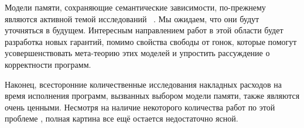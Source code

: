 Модели памяти, сохраняющие семантические зависимости, 
по-прежнему являются активной темой исследований~%
\cite{Kang-al:POPL17, Lee-al:PLDI20, Cho-al:PLDI21,
Chakraborty-Vafeiadis:POPL19, Paviotti-al:ESOP20, 
Jagadeesan-al:OOPSLA2020}.
Мы ожидаем, что они будут уточняться в будущем. 
Интересным направлением работ в этой области 
будет разработка новых гарантий, 
помимо свойства свободы от гонок, 
которые помогут усовершенствовать мета-теорию 
этих моделей и упростить рассуждение о корректности программ. 

Наконец, всесторонние количественные исследования 
накладных расходов на время исполнения программ, 
вызванных выбором модели памяти, также являются очень ценными. 
Несмотря на наличие некоторого количества работ по этой проблеме%
\cite{Singh-al:ISCA12, Liu-al:OOPSLA17, Liu-al:PLDI19, 
Vollmer-al:PPoPP17, Dolan-al:PLDI18, Ou-Demsky:OOPSLA18}, 
полная картина все ещё остается недостаточно ясной. 